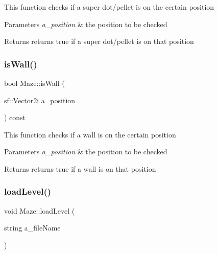 This function checks if a super dot/pellet is on the certain position


\begin{DoxyParams}{Parameters}
{\em a\+\_\+position} & the position to be checked \\
\hline
\end{DoxyParams}
\begin{DoxyReturn}{Returns}
returns true if a super dot/pellet is on that position 
\end{DoxyReturn}
\mbox{\label{class_maze_a51a92b406d8376082d6c4f8c67b1490b}} 
\subsubsection{\texorpdfstring{is\+Wall()}{isWall()}}
{\footnotesize\ttfamily bool Maze\+::is\+Wall (\begin{DoxyParamCaption}\item[{sf\+::\+Vector2i}]{a\+\_\+position }\end{DoxyParamCaption}) const}

This function checks if a wall is on the certain position


\begin{DoxyParams}{Parameters}
{\em a\+\_\+position} & the position to be checked \\
\hline
\end{DoxyParams}
\begin{DoxyReturn}{Returns}
returns true if a wall is on that position 
\end{DoxyReturn}
\mbox{\label{class_maze_a130c9d8858022b05b083a3f0c630fbaf}} 
\subsubsection{\texorpdfstring{load\+Level()}{loadLevel()}}
{\footnotesize\ttfamily void Maze\+::load\+Level (\begin{DoxyParamCaption}\item[{string}]{a\+\_\+file\+Name }\end{DoxyParamCaption})}

